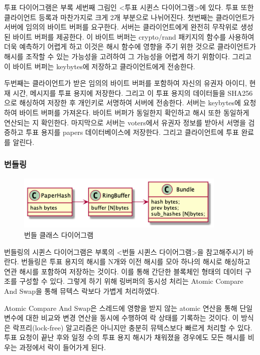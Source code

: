 \documentclass[8pt,a4paper,left=8mm,right=8mm,top=10mm,bottom=10mm]{article}
\begin{document}
    투표 다이어그램은 부록 세번째 그림인 <투표 시퀸스 다이어그램>에 있다. 투표 또한 클라이언트 등록과 마찬가지로 크게 2개 부분으로 나뉘어진다. 첫번째는 클라이언트가 서버에 임의의 바이트 버퍼를 요구한다. 서버는 클라이언트에게 완전히 무작위로 생성된 바이트 버퍼를 제공한다. 이 바이트 버퍼는 crypto/rand 패키지의 함수를 사용하여 더욱 예측하기 어렵게 하고 이것은 해시 함수에 영향을 주기 위한 것으로 클라이언트가 해시를 조작할 수 있는 가능성을 고려하여 그 가능성을 어렵게 하기 위함이다. 그리고 이 바이트 버퍼는 keybytes에 저장하고 클라이언트에게 전송한다.

    두번째는 클라이언트가 받은 임의의 바이트 버퍼를 포함하여 자신의 유권자 아이디, 현재 시간, 메시지를 투표 용지에 저장한다. 그리고 이 투표 용지의 데이터들을 SHA256으로 해싱하여 저장한 후 개인키로 서명하여 서버에 전송한다. 서버는 keybytes에 요청하여 바이트 버퍼를 가져온다. 바이트 버퍼가 동일한지 확인하고 해시 또한 동일하게 연산되는 지 확인한다. 마지막으로 서버는 voters에서 유권자 정보를 받아서 서명을 검증하고 투표 용지를 papers 데이터베이스에 저장한다. 그리고 클라이언트에 투표 완료를 알린다.

    \subsubsection{번들링}

    \begin{figure}[h]
        \begin{center}
            \includegraphics[width=10cm]{bundle}
            \caption{번들 클래스 다이어그램}
        \end{center}
    \end{figure}

    번들링의 시퀸스 다이어그램은 부록의 <번들 시퀸스 다이어그램>을 참고해주시기 바란다. 번들링은 투표 용지의 해시를 N개와 이전 해시를 모아 하나의 해시로 해싱하고 연관 해시를 포함하여 저장하는 것이다. 이를 통해 간단한 블록체인 형태의 데이터 구조를 구성할 수 있다. 그렇게 하기 위해 링버퍼의 동시성 처리는 Atomic Compare And Swap을 통해 뮤텍스 락보다 가볍게 처리하였다.

    Atomic Compare And Swap은 스레드에 영향을 받지 않는 atomic 연산을 통해 단일 변수에 대한 비교와 변경 연산을 동시에 수행하여 락 상태를 기록하는 것이다. 이 방식은 락프리(lock-free) 알고리즘은 아니지만 충분히 뮤텍스보다 빠르게 처리할 수 있다. 투표 요청이 끝난 후와 일정 수의 투표 용지 해시가 채워졌을 경우에도 모든 해시를 비우는 과정에서 락이 들어가게 된다. 
\end{document}
